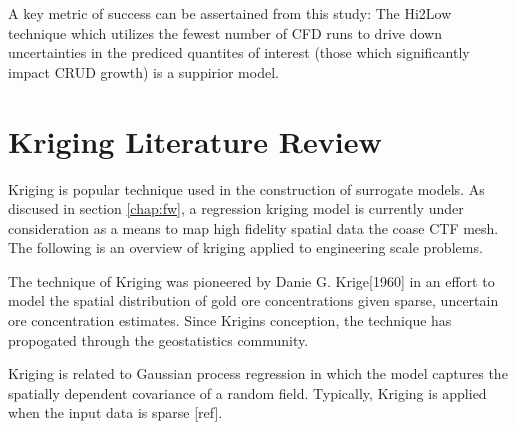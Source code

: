 A key metric of success can be assertained from this study:  The Hi2Low technique which utilizes the fewest number of CFD runs to drive down uncertainties in the prediced quantites of interest (those which significantly impact CRUD growth) is a suppirior model.


\section{Kriging Literature Review}

Kriging is popular technique used in the construction of surrogate models.  As discused in section \ref{chap:fw}, a regression kriging model is currently under consideration as a means to map high fidelity spatial data the coase CTF mesh. The following is an overview of kriging applied to engineering scale problems.

The technique of Kriging was pioneered by Danie G. Krige[1960] in an effort to model the spatial distribution of gold ore concentrations given sparse, uncertain ore concentration estimates. Since Krigins conception, the technique has propogated through the geostatistics community.

Kriging is related to Gaussian process regression in which the model captures the spatially dependent covariance of a random field.  Typically, Kriging is applied when the input data is sparse [ref].
